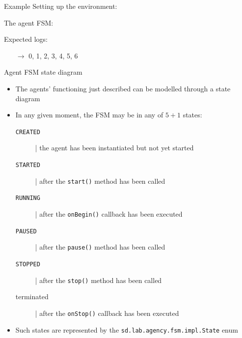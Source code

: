 \documentclass[presentation]{beamer}\mode<presentation>{\usetheme{AMSCesenaPurpleAndGold}}
\begin{document}
\begin{frame}[allowframebreaks]{Example}
    Setting up the environment:
    

    \framebreak

    The agent FSM:
    

    Expected logs:
    \begin{itemize}
    	\item[$\rightarrow$] 0, 1, 2, 3, 4, 5, 6
    \end{itemize}
\end{frame}

\begin{frame}[allowframebreaks]{Agent FSM state diagram}

    \begin{itemize}
        \item The agents' functioning just described can be modelled through a state diagram

        \bigskip

        \item In any given moment, the FSM may be in any of $5+1$ states:
        \begin{description}
            \item[\texttt{CREATED}] | the agent has been instantiated but not yet started

            \item[\texttt{STARTED}] | after the \texttt{start()} method has been called

            \item[\texttt{RUNNING}] | after the \texttt{onBegin()} callback has been executed

            \item[\texttt{PAUSED}] | after the \texttt{pause()} method has been called

            \item[\texttt{STOPPED}] | after the \texttt{stop()} method has been called

            \item[terminated] | after the \texttt{onStop()} callback has been executed
        \end{description}

    	\bigskip

    	\item Such states are represented by the \texttt{sd.lab.agency.fsm.impl.\alert{State}} enum


\end{itemize}
\end{frame}
\end{document}
